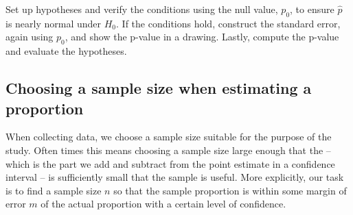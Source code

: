 \begin{termBox}{
Set up hypotheses and verify the conditions using the null value, $p_0$, to ensure $\hat{p}$ is nearly normal under $H_0$. If the conditions hold, construct the standard error, again using $p_0$, and show the p-value in a drawing. Lastly, compute the p-value and evaluate the hypotheses.}
\end{termBox}




\subsection{Choosing a sample size when estimating a proportion}


When collecting data, we choose a sample size suitable for the purpose of the study. Often times this means choosing a sample size large enough that the  -- which is the part we add and subtract from the point estimate in a confidence interval -- is sufficiently small that the sample is useful. More explicitly, our task is to find a sample size $n$ so that the sample proportion is within some margin of error $m$ of the actual proportion with a certain level of confidence.


